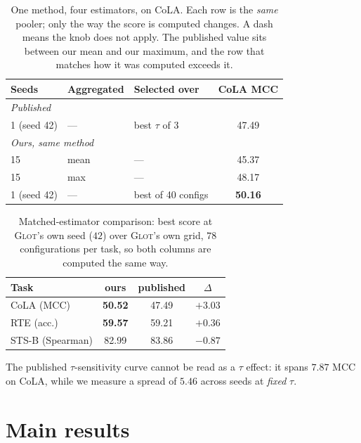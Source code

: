 \documentclass{article}
\begin{document}
\begin{table}[h]
\caption{One method, four estimators, on CoLA. Each row is the \emph{same}
pooler; only the way the score is computed changes. A dash means the knob does
not apply. The published value sits between our mean and our maximum, and the
row that matches how it was computed exceeds it.}
\label{tab:estimator}
\begin{center}
\small
\begin{tabular}{lllc}
\toprule
Seeds & Aggregated & Selected over & CoLA MCC \\
\midrule
\multicolumn{4}{l}{\emph{Published \citep{mantri2026glot}}} \\
1 (seed 42) & --- & best $\tau$ of 3 & 47.49 \\
\midrule
\multicolumn{4}{l}{\emph{Ours, same method}} \\
15 & mean & --- & 45.37 \\
15 & max  & --- & 48.17 \\
1 (seed 42) & --- & best of 40 configs & \textbf{50.16} \\
\bottomrule
\end{tabular}
\end{center}
\end{table}

\begin{table}[h]
\caption{Matched-estimator comparison: best score at \textsc{Glot}'s own seed
($42$) over \textsc{Glot}'s own grid, $78$ configurations per task, so both
columns are computed the same way.}
\label{tab:repro}
\begin{center}
\small
\begin{tabular}{lccc}
\toprule
Task & ours & published & $\Delta$ \\
\midrule
CoLA (MCC)       & \textbf{50.52} & 47.49 & $+3.03$ \\
RTE (acc.)       & \textbf{59.57} & 59.21 & $+0.36$ \\
STS-B (Spearman) & 82.99 & 83.86 & $-0.87$ \\
\bottomrule
\end{tabular}
\end{center}
\end{table}

The published $\tau$-sensitivity curve cannot be read as a $\tau$ effect: it
spans $7.87$ MCC on CoLA, while we measure a spread of $5.46$ across seeds at
\emph{fixed} $\tau$.

\section{Main results}
\label{app:results}
\end{document}
